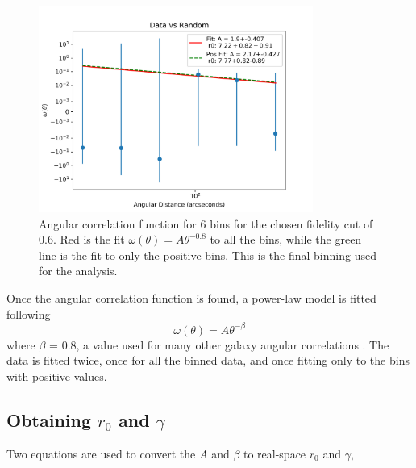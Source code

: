 \begin{figure}[!htbp]
\centering \includegraphics[width=90mm]{clustering_two/Data_vs_Random_10000_bin6_sn0_6_NFalse.png}
\caption{Angular correlation function for 6 bins for the chosen fidelity cut of 0.6. Red is the fit $\omega(\theta) = A\theta^{-0.8}$ to all the bins, while the green line is the fit to only the positive bins. This is the final binning used for the analysis. }
\label{fig:Angular_binnings}
\end{figure}


Once the angular correlation function is found, a power-law model is fitted following $$\omega(\theta) = A\theta^{-\beta} $$ where $\beta$ = 0.8, a value used for many other galaxy angular correlations \cite{hickox2011clustering}. The data is fitted twice, once for all the binned data, and once fitting only to the bins with positive values.

\subsection{Obtaining $r_0$ and $\gamma$}


Two equations are used to convert the $A$ and $\beta$ to real-space $r_0$ and $\gamma$, 

